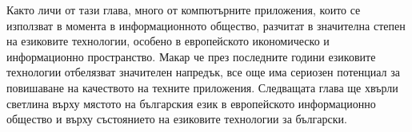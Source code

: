 \documentclass[]{../../metanetpaper}
\begin{document}
\begin{multicols}{2}
Както личи от тази глава, много от компютърните приложения, които се използват в момента в информационното общество, разчитат в значителна степен на езиковите технологии, особено в европейското икономическо и информационно пространство. Макар че през последните години езиковите технологии отбелязват значителен напредък, все още има сериозен потенциал за повишаване на  качеството на техните приложения. Следващата глава ще хвърли светлина върху мястото на българския език в европейското информационно общество и върху състоянието на езиковите технологии за български.  
\end{multicols}

\clearpage

\end{document}
